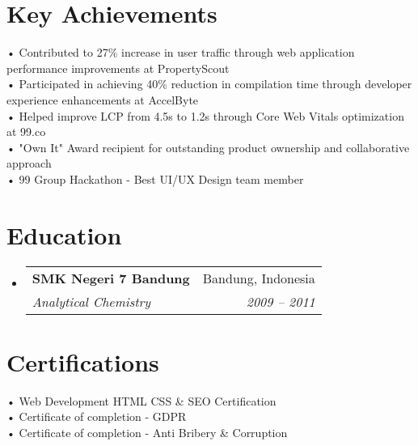 \documentclass[a4paper, 11pt]{article}
\makeatletter
\newcommand{\resumeSubheading}[4]{
  \vspace{-2pt}\item
    \begin{tabular*}{0.97\textwidth}[t]{l@{\extracolsep{\fill}}r}
      \textbf{#1} & #2 \\
      \textit{\small#3} & \textit{\small #4} \\
    \end{tabular*}\vspace{-7pt}
}
\newcommand{\resumeSubHeadingListStart}{\begin{itemize}[leftmargin=0.15in, label={}]}
\newcommand{\resumeSubHeadingListEnd}{\end{itemize}}
\makeatother
\begin{document}
\section{Key Achievements}
  \begin{itemize}[leftmargin=0.15in, label={}]
    \small{\item{
     • Contributed to 27\% increase in user traffic through web application performance improvements at PropertyScout \\
     • Participated in achieving 40\% reduction in compilation time through developer experience enhancements at AccelByte \\
     • Helped improve LCP from 4.5s to 1.2s through Core Web Vitals optimization at 99.co \\
     • "Own It" Award recipient for outstanding product ownership and collaborative approach \\
     • 99 Group Hackathon - Best UI/UX Design team member
    }}
  \end{itemize}

\section{Education}
  \resumeSubHeadingListStart
    \resumeSubheading
      {SMK Negeri 7 Bandung}{Bandung, Indonesia}
      {Analytical Chemistry}{2009 -- 2011}
  \resumeSubHeadingListEnd

\section{Certifications}
  \begin{itemize}[leftmargin=0.15in, label={}]
    \small{\item{
     • Web Development HTML CSS \& SEO Certification \\
     • Certificate of completion - GDPR \\
     • Certificate of completion - Anti Bribery \& Corruption
    }}
  \end{itemize}
\end{document}
